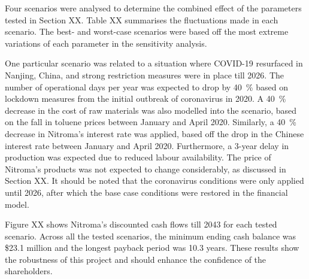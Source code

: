 Four scenarios were analysed to determine the combined effect of the parameters tested in Section XX. Table XX summarises the fluctuations made in each scenario. The best- and worst-case scenarios were based off the most extreme variations of each parameter in the sensitivity analysis. 



One particular scenario was related to a situation where COVID-19 resurfaced in Nanjing, China, and strong restriction measures were in place till 2026. The number of operational days per year was expected to drop by \SI{40}{\percent} based on lockdown measures from the initial outbreak of coronavirus in 2020. A \SI{40}{\percent} decrease in the cost of raw materials was also modelled into the scenario, based on the fall in toluene prices between January and April 2020. Similarly, a \SI{40}{\percent} decrease in Nitroma’s interest rate was applied, based off the drop in the Chinese interest rate between January and April 2020. Furthermore, a 3-year delay in production was expected due to reduced labour availability. The price of Nitroma’s products was not expected to change considerably, as discussed in Section XX. It should be noted that the coronavirus conditions were only applied until 2026, after which the base case conditions were restored in the financial model.


Figure XX shows Nitroma’s discounted cash flows till 2043 for each tested scenario. Across all the tested scenarios, the minimum ending cash balance was \$23.1 million and the longest payback period was 10.3 years. These results show the robustness of this project and should enhance the confidence of the shareholders.
